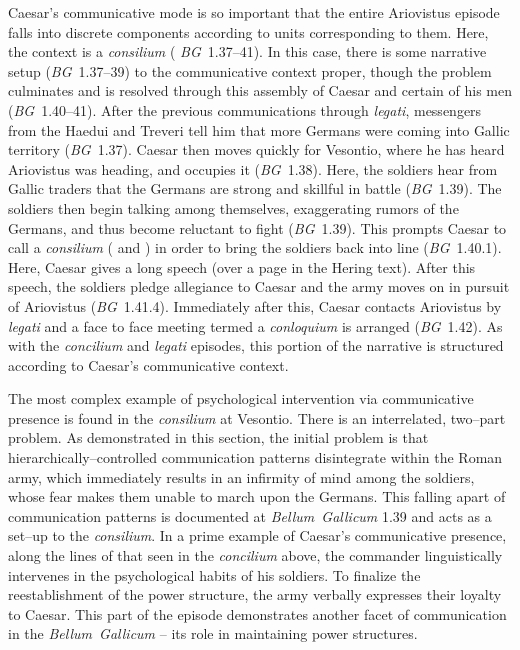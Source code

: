 \documentclass[12pt,letterpaper,oneside,final]{memoir}
\begin{document}
Caesar's communicative mode is so important that the entire Ariovistus episode falls into discrete components according to units corresponding to them. Here, the context is a \emph{consilium} ( \emph{BG}~1.37--41). In this case, there is some narrative setup (\emph{BG}~1.37--39) to the communicative context proper, though the problem culminates and is resolved through this assembly of Caesar and certain of his men (\emph{BG}~1.40--41). After the previous communications through \emph{legati}, messengers from the Haedui and Treveri tell him that more Germans were coming into Gallic territory (\emph{BG}~1.37). Caesar then moves quickly for Vesontio, where he has heard Ariovistus was heading, and occupies it (\emph{BG}~1.38). Here, the soldiers hear from Gallic traders that the Germans are strong and skillful in battle  (\emph{BG}~1.39). The soldiers then begin talking among themselves, exaggerating rumors of the Germans, and thus become reluctant to fight (\emph{BG}~1.39). This prompts Caesar to call a \emph{consilium} ( and ) in order to bring the soldiers back into line (\emph{BG}~1.40.1). Here, Caesar gives a long speech (over a page in the Hering text). After this speech, the soldiers pledge allegiance to Caesar and the army moves on in pursuit of Ariovistus (\emph{BG}~1.41.4). Immediately after this, Caesar contacts Ariovistus by \emph{legati} and a face to face meeting termed a \emph{conloquium} is arranged (\emph{BG}~1.42). As with the \emph{concilium} and \emph{legati} episodes, this portion of the narrative is structured according to Caesar's communicative context.

The most complex example of psychological intervention via communicative presence is found in the \emph{consilium} at Vesontio. There is an interrelated, two--part problem. As demonstrated in this section, the initial problem is that hierarchically--controlled communication patterns disintegrate within the Roman army, which immediately results in an infirmity of mind among the soldiers, whose fear makes them unable to march upon the Germans. This falling apart of communication patterns is documented at \emph{Bellum~Gallicum} 1.39 and acts as a set--up to the \emph{consilium}. In a prime example of Caesar's communicative presence, along the lines of that seen in the \emph{concilium} above, the commander linguistically intervenes in the psychological habits of his soldiers. To finalize the reestablishment of the power structure, the army verbally expresses their loyalty to Caesar. This part of the episode demonstrates another facet of communication in the \emph{Bellum~Gallicum} -- its role in maintaining power structures.
\end{document}
